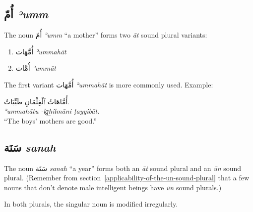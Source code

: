 \documentclass[
  10pt,
]{book}
\providecommand{\tightlist}{%
  \setlength{\itemsep}{0pt}\setlength{\parskip}{0pt}}
\begin{document}
\subsection{\texorpdfstring{\foreignlanguage{arabic}{أُمّ} \emph{ʾumm}}{أُمّ ʾumm}}\label{ux623ux645-eumm}

The noun
\foreignlanguage{arabic}{أُمّ} \emph{ʾumm} \enquote{a mother}
forms two \emph{āt} sound plural variants:

\begin{enumerate}
\def\labelenumi{\roman{enumi}.}
\tightlist
\item
  \foreignlanguage{arabic}{أُمَّهَات} \emph{ʾummahāt}
\item
  \foreignlanguage{arabic}{أُمَّات} \emph{ʾummāt}
\end{enumerate}

The first variant
\foreignlanguage{arabic}{أُمَّهَات} \emph{ʾummahāt}
is more commonly used.
Example:

\foreignlanguage{arabic}{أُمَّاهَاتُ ٱلْغِلْمَانِ طَيِّبَاتٌ.}\\
\emph{ʾummahātu -lg͟hilmāni ṭayyibāt.}\\
\enquote{The boys' mothers are good.}

\subsection{\texorpdfstring{\foreignlanguage{arabic}{سَنَة} \emph{sanah}}{سَنَة sanah}}\label{ux633ux646ux629-sanah}

The noun
\foreignlanguage{arabic}{سَنَة} \emph{sanah} \enquote{a year}
forms both an \emph{āt} sound plural
and an \emph{ūn} sound plural.
(Remember from
section~\ref{applicability-of-the-un-sound-plural}
that a few nouns that don't denote male intelligent beings have \emph{ūn} sound plurals.)

In both plurals, the singular noun is modified irregularly.
\end{document}
